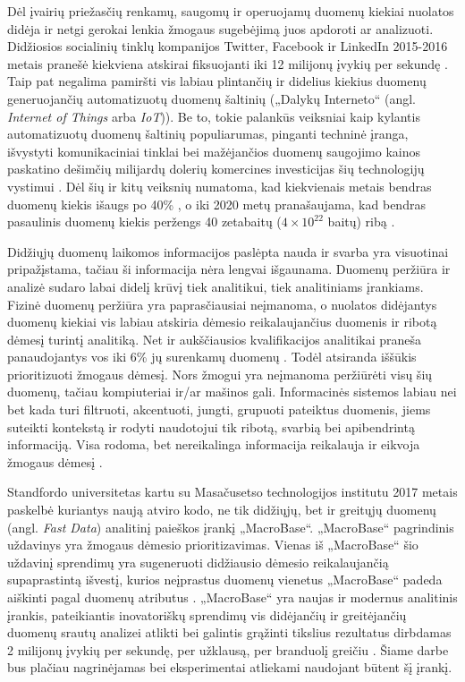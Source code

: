 \documentclass{VUMIFPSkursinis}
\begin{document}
Dėl įvairių priežasčių renkamų, saugomų ir operuojamų duomenų kiekiai nuolatos didėja ir netgi gerokai lenkia žmogaus sugebėjimą juos apdoroti ar analizuoti. Didžiosios socialinių tinklų kompanijos Twitter, Facebook ir LinkedIn 2015-2016 metais pranešė kiekviena atskirai fiksuojanti iki 12 milijonų įvykių per sekundę \cite{twitter, facebook, linkedin}. Taip pat negalima pamiršti vis labiau plintančių ir didelius kiekius duomenų generuojančių automatizuotų duomenų šaltinių („Dalykų Interneto“ (angl. \textit{Internet of Things} arba \textit{IoT})). Be to, tokie palankūs veiksniai kaip kylantis automatizuotų duomenų šaltinių populiarumas, pinganti techninė įranga, išvystyti komunikaciniai tinklai bei mažėjančios duomenų saugojimo kainos paskatino dešimčių milijardų dolerių komercines investicijas šių technologijų vystimui \cite{iot_investments}. Dėl šių ir kitų veiksnių numatoma, kad kiekvienais metais bendras duomenų kiekis išaugs po 40\% \cite{iot}, o iki 2020 metų pranašaujama, kad bendras pasaulinis duomenų kiekis peržengs 40 zetabaitų ($4\times{10}^{22}$ baitų) ribą \cite{future_data_volume}.\par

Didžiųjų duomenų laikomos informacijos paslėpta nauda ir svarba yra visuotinai pripažįstama, tačiau ši informacija nėra lengvai išgaunama. Duomenų peržiūra ir analizė sudaro labai didelį krūvį tiek analitikui, tiek analitiniams įrankiams. Fizinė duomenų peržiūra yra paprasčiausiai neįmanoma, o nuolatos didėjantys duomenų kiekiai vis labiau atskiria dėmesio reikalaujančius duomenis ir ribotą dėmesį turintį analitiką. Net ir aukščiausios kvalifikacijos analitikai praneša panaudojantys vos iki 6\% jų surenkamų duomenų \cite{prioritizing_attention}. Todėl atsiranda iššūkis prioritizuoti žmogaus dėmesį. Nors žmogui yra neįmanoma peržiūrėti visų šių duomenų, tačiau kompiuteriai ir/ar mašinos gali. Informacinės sistemos labiau nei bet kada turi filtruoti, akcentuoti, jungti, grupuoti pateiktus duomenis, jiems suteikti kontekstą ir rodyti naudotojui tik ribotą, svarbią bei apibendrintą informaciją. Visa rodoma, bet nereikalinga informacija reikalauja ir eikvoja žmogaus dėmesį \cite{attention}.\par

Standfordo universitetas kartu su Masačusetso technologijos institutu 2017 metais paskelbė kuriantys naują atviro kodo, ne tik didžiųjų, bet ir greitųjų duomenų (angl. \textit{Fast Data}) analitinį paieškos įrankį „MacroBase“. „MacroBase“ pagrindinis uždavinys yra žmogaus dėmesio prioritizavimas. Vienas iš „MacroBase“ šio uždavinį sprendimų yra sugeneruoti didžiausio dėmesio reikalaujančią supaprastintą išvestį, kurios neįprastus duomenų vienetus „MacroBase“ padeda aiškinti pagal duomenų atributus \cite{macrobase_overview, prioritizing_attention}. „MacroBase“ yra naujas ir modernus analitinis įrankis, pateikiantis inovatoriškų sprendimų vis didėjančių ir greitėjančių duomenų srautų analizei atlikti bei galintis grąžinti tikslius rezultatus dirbdamas 2 milijonų įvykių per sekundę, per užklausą, per branduolį greičiu \cite{macrobase_overview}. Šiame darbe bus plačiau nagrinėjamas bei eksperimentai atliekami naudojant būtent šį įrankį.
\end{document}
